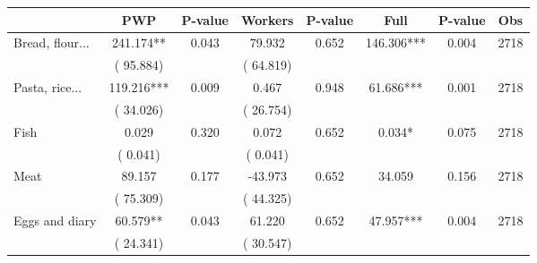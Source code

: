 
\begin{tabular}{l*{7}{c}}\hline&\multicolumn{1}{c}{PWP}&\multicolumn{1}{c}{P-value}&\multicolumn{1}{c}{Workers}&\multicolumn{1}{c}{P-value}&\multicolumn{1}{c}{Full}&\multicolumn{1}{c}{P-value}&\multicolumn{1}{c}{Obs} \\ \hline

 Bread, flour...       &            241.174**       &        0.043  &             79.932       &        0.652  &            146.306***       &              0.004 &  2718 \\ 
                       &       (      95.884)             &                               &       (      64.819)                     &                               &                                               &                                &                      \\ 

 Pasta, rice...       &            119.216***       &        0.009  &              0.467       &        0.948  &             61.686***       &              0.001 &  2718 \\ 
                       &       (      34.026)             &                               &       (      26.754)                     &                               &                                               &                                &                      \\ 

 Fish       &              0.029       &        0.320  &              0.072       &        0.652  &              0.034*       &              0.075 &  2718 \\ 
                       &       (       0.041)             &                               &       (       0.041)                     &                               &                                               &                                &                      \\ 

 Meat       &             89.157       &        0.177  &            -43.973       &        0.652  &             34.059       &              0.156 &  2718 \\ 
                       &       (      75.309)             &                               &       (      44.325)                     &                               &                                               &                                &                      \\ 

 Eggs and diary       &             60.579**       &        0.043  &             61.220       &        0.652  &             47.957***       &              0.004 &  2718 \\ 
                       &       (      24.341)             &                               &       (      30.547)                     &                               &                                               &                                &                      \\ 


\end{tabular}

